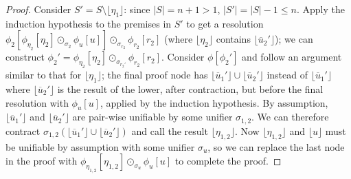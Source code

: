 \documentclass[12pt]{article}
\theoremstyle{definition}
\theoremstyle{remark}
\newcommand{\clause}[1]{ \lfloor{#1} \rfloor}
\begin{document}
\begin{proof}
Consider $S'=S\setminus\clause{\eta_1}$: since $|S|=n+1>1$, $|S'| = |S|-1 \le n$. Apply the induction hypothesis to the premises in $S'$ to get a  resolution $\phi_2[\phi_{\eta_2}[\eta_2] \odot_{\sigma_2} \phi_u[u]] \odot_{\sigma_{r_2}} \phi_{r_2}[r_2]$ (where $\clause{\eta_2}$ contains $\clause{\overline{u}_2'}$);  we can construct $\phi_2' = \phi_{\eta_2}[\eta_2] \odot_{\sigma_{r_2'}} \phi_{r_2}[r_2]$. Consider  $\phi[\phi_2']$ and follow an argument similar to that for $\clause{\eta_1}$; the final proof node has $\clause{\overline{u}_1'} \cup \clause{\overline{u}_2'}$ instead of $\clause{\overline{u}_1'}$ where $\clause{\overline{u}_2'}$ is the result of the lower, after contraction, but before the final resolution with $\phi_u[u]$, applied by the induction hypothesis.  By assumption, $\clause{\overline{u}_1'}$ and $\clause{\overline{u}_2'}$ are pair-wise unifiable by some unifier $\sigma_{1,2}$. We can therefore contract $\sigma_{1,2}(\clause{\overline{u}_1'} \cup \clause{\overline{u}_2'})$ and call the result $\clause{\eta_{1,2}}$. Now $\clause{\eta_{1,2}}$ and $\clause{u}$ must be unifiable by assumption with some unifier $\sigma_u$, so we can replace the last node in the proof with $\phi_{\eta_{1,2}}[\eta_{1,2}]\odot_{\sigma_u} \phi_u[u]$ to complete the proof.
\end{proof}
\end{document}
